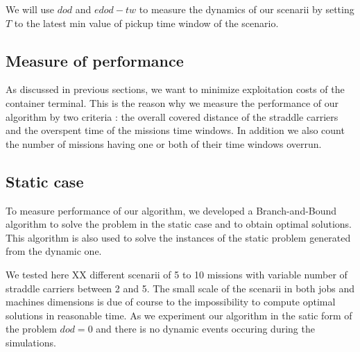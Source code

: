 \documentclass[a4paper,10pt]{article}
\begin{document}
We will use $dod$ and $edod-tw$ to measure the dynamics of our scenarii by setting $T$ to the latest min value of pickup time window of the scenario.

	\subsection{Measure of performance}
As discussed in previous sections, we want to minimize exploitation costs of the container terminal. This is the reason why we measure the performance of our algorithm by two criteria : the overall covered distance of the straddle carriers and the overspent time of the missions time windows. In addition we also count the number of missions having one or both of their time windows overrun.

	\subsection{Static case}
To measure performance of our algorithm, we developed a Branch-and-Bound algorithm to solve the problem in the static case and to obtain optimal solutions. This algorithm is also used to solve the instances of the static problem generated from the dynamic one.

  We tested here XX different scenarii of 5 to 10 missions with variable number of straddle carriers between 2 and 5. The small scale of the scenarii in both jobs and machines dimensions is due of course to the impossibility to compute optimal solutions in reasonable time.
  As we experiment our algorithm in the satic form of the problem $dod=0$ and there is no dynamic events occuring during the simulations.
\end{document}

